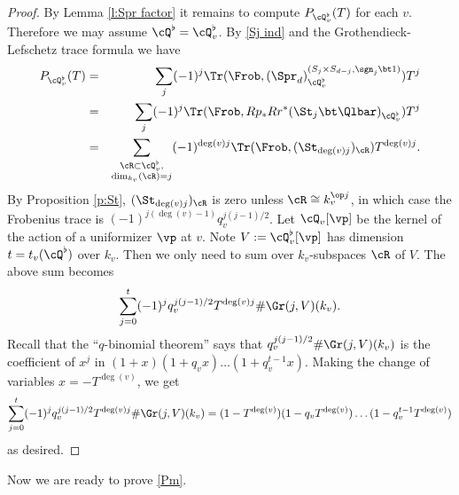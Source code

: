\begin{proof}
By Lemma \ref{l:Spr factor} it remains to compute $P_{\cQ^{\flat}_{v}}(T)$ for each $v$. Therefore we may assume $\cQ^{\flat}=\cQ^{\flat}_{v}$.  By \eqref{Sj ind} and the Grothendieck-Lefschetz trace formula we have
\begin{eqnarray*}
P_{\cQ^{\flat}_{v}}(T)&=& \sum_{j}(-1)^{j}\Tr(\Frob, (\Spr_{d})^{(S_{j}\times S_{d-j}, \sgn_{j}\bt1)}_{\cQ^{\flat}_{v}})T^{j}\\
 &= &\sum_{j}(-1)^{j}\Tr(\Frob, Rp_{*}Rr^{*}(\St_{j}\bt\Qlbar)_{\cQ_{v}^{\flat}})T^j\\
&=& \sum_{\substack{\cR\subset \cQ^{\flat}_{v}, \\ \dim_{k_v} (\cR)=j}}(-1)^{\deg(v)j}\Tr(\Frob, (\St_{\deg(v)j})_{\cR})T^{\deg(v)j}.
\end{eqnarray*}
By Proposition \ref{p:St}, $(\St_{\deg(v)j})_{\cR}$ is zero unless $\cR\cong k_{v}^{\op j}$, in which case the Frobenius trace is $(-1)^{j(\deg(v)-1)}q_{v}^{j(j-1)/2}$. Let $\cQ_{v}[\vp]$ be the kernel of the action of a uniformizer $\vp$ at $v$. Note $V:=\cQ^{\flat}_{v}[\vp]$ has dimension $t=t_{v}(\cQ^{\flat})$ over $k_{v}$.  Then we only need to sum over $k_{v}$-subspaces $\cR$ of $V$. The above sum becomes
\begin{equation*}
\sum_{j=0}^{t}(-1)^{j}q_{v}^{j(j-1)/2}T^{\deg(v)j}\#\Gr(j,V)(k_{v}).
\end{equation*}
Recall that the ``$q$-binomial theorem'' says that $q_v^{j(j-1)/2} \# \Gr(j, V)(k_{v})$ is the coefficient of $x^j$ in $(1+x)(1+q_vx)\ldots(1+q_v^{t-1}x)$. Making the change of variables $x=-T^{\deg(v)}$, we get
\[
\sum_{j=0}^{t}(-1)^{j}q_{v}^{j(j-1)/2}T^{\deg(v)j}\#\Gr(j,V)(k_{v}) =(1-T^{\deg(v)})(1-q_{v}T^{\deg(v)})\ldots(1-q_v^{t-1}T^{\deg(v)})
\]
as desired.
\end{proof}






Now we are ready to prove \eqref{Pm}.


